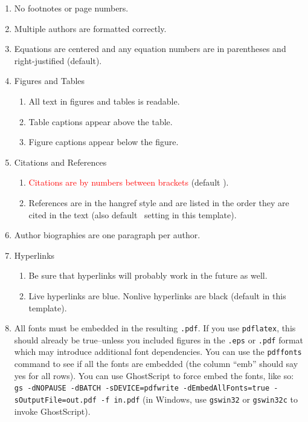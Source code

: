 \documentclass{article}
\begin{document}
\begin{enumerate}
	\item No footnotes or page numbers.
	\item Multiple authors are formatted correctly.
	\item Equations are centered and any equation numbers are in parentheses and right-justified (default).
	\item Figures and Tables
  \begin{enumerate}
	  \item All text in figures and tables is readable.
	  \item Table captions appear above the table.
	  \item Figure captions appear below the figure.
	\end{enumerate}
	\item Citations and References
  \begin{enumerate}
	  \item \textcolor{red}{Citations are by numbers between brackets} (default \BibTeX). 
	  \item References are in the hangref style and are listed in the order they are cited in the text (also default \BibTeX\ setting in this template). 
	\end{enumerate}
	\item Author biographies are one paragraph per author.
	\item Hyperlinks
  \begin{enumerate}
	  \item Be sure that hyperlinks will probably work in the future as well.
	  \item Live hyperlinks are blue. Nonlive hyperlinks are black (default in this template).
	\end{enumerate}
	\item All fonts must be embedded in the resulting \texttt{.pdf}. If you use \texttt{pdflatex}, this should already be true--unless you included figures in the \texttt{.eps} or \texttt{.pdf} format which may introduce additional font dependencies. You can use the \texttt{pdffonts} command to see if all the fonts are embedded (the column ``emb'' should say yes for all rows). You can use GhostScript to force embed the fonts, like so: {\texttt{gs -dNOPAUSE -dBATCH -sDEVICE=pdfwrite -dEmbedAllFonts=true -sOutputFile=out.pdf -f in.pdf}} (in Windows, use \texttt{gswin32} or \texttt{gswin32c} to invoke GhostScript).
\end{enumerate}
\end{document}
